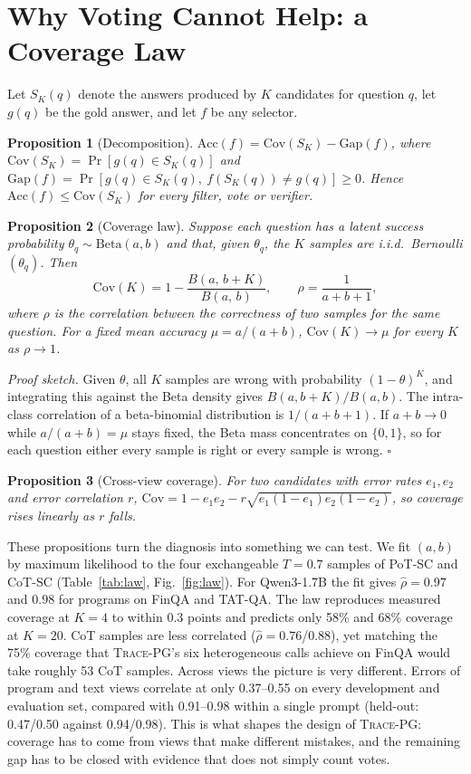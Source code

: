 \documentclass[conference]{IEEEtran}
\newcommand{\ours}{\textsc{Trace-PG}}
\newtheorem{proposition}{Proposition}
\begin{document}
\section{Why Voting Cannot Help: a Coverage Law}
\label{sec:theory}
Let $S_K(q)$ denote the answers produced by $K$ candidates for question $q$, let $g(q)$ be the gold answer, and let $f$ be any selector.
\begin{proposition}[Decomposition]
$\mathrm{Acc}(f) = \mathrm{Cov}(S_K) - \mathrm{Gap}(f)$, where $\mathrm{Cov}(S_K)=\Pr[g(q)\in S_K(q)]$ and $\mathrm{Gap}(f) = \Pr[g(q)\in S_K(q),\ f(S_K(q))\neq g(q)] \ge 0$. Hence $\mathrm{Acc}(f)\le \mathrm{Cov}(S_K)$ for every filter, vote or verifier.
\end{proposition}
\begin{proposition}[Coverage law]
Suppose each question has a latent success probability $\theta_q \sim \mathrm{Beta}(a,b)$ and that, given $\theta_q$, the $K$ samples are i.i.d.\ Bernoulli$(\theta_q)$. Then
\begin{equation}
\mathrm{Cov}(K) = 1 - \frac{B(a,\, b+K)}{B(a,\, b)}, \qquad \rho = \frac{1}{a+b+1},
\label{eq:law}
\end{equation}
where $\rho$ is the correlation between the correctness of two samples for the same question. For a fixed mean accuracy $\mu = a/(a+b)$, $\mathrm{Cov}(K)\to\mu$ for every $K$ as $\rho\to1$.
\end{proposition}
\emph{Proof sketch.} Given $\theta$, all $K$ samples are wrong with probability $(1-\theta)^K$, and integrating this against the Beta density gives $B(a,b+K)/B(a,b)$. The intra-class correlation of a beta-binomial distribution is $1/(a+b+1)$. If $a+b\to0$ while $a/(a+b)=\mu$ stays fixed, the Beta mass concentrates on $\{0,1\}$, so for each question either every sample is right or every sample is wrong. $\square$

\begin{proposition}[Cross-view coverage]
For two candidates with error rates $e_1,e_2$ and error correlation $r$, $\mathrm{Cov}=1-e_1e_2-r\sqrt{e_1(1-e_1)e_2(1-e_2)}$, so coverage rises linearly as $r$ falls.
\end{proposition}
These propositions turn the diagnosis into something we can test. We fit $(a,b)$ by maximum likelihood to the four exchangeable $T{=}0.7$ samples of PoT-SC and CoT-SC (Table~\ref{tab:law}, Fig.~\ref{fig:law}). For Qwen3-1.7B the fit gives $\hat\rho=0.97$ and $0.98$ for programs on FinQA and TAT-QA. The law reproduces measured coverage at $K{=}4$ to within 0.3 points and predicts only 58\% and 68\% coverage at $K{=}20$. CoT samples are less correlated ($\hat\rho=0.76$/$0.88$), yet matching the 75\% coverage that \ours{}'s six heterogeneous calls achieve on FinQA would take roughly 53 CoT samples. Across views the picture is very different. Errors of program and text views correlate at only 0.37--0.55 on every development and evaluation set, compared with 0.91--0.98 within a single prompt (held-out: 0.47/0.50 against 0.94/0.98). This is what shapes the design of \ours{}: coverage has to come from views that make different mistakes, and the remaining gap has to be closed with evidence that does not simply count votes.
\end{document}
